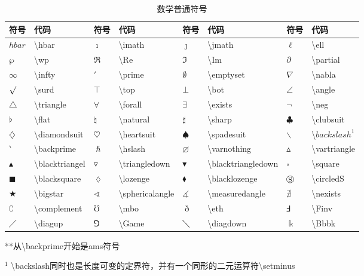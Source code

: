 \documentclass[UTF8,fontset=ubuntu]{ctexart}
\begin{document}
\begin{table}
\begin{tabular}{l l l l l l l l}
	\hline
	符号 & 代码 & 符号 & 代码 & 符号 & 代码 & 符号 & 代码\\
	\hline
	$hbar$ & \textbackslash hbar & $\imath$ & \textbackslash imath & $\jmath$ & \textbackslash jmath & $\ell$ & \textbackslash ell\\
	$\wp$ & \textbackslash wp & $\Re$ & \textbackslash Re & $\Im$ & \textbackslash Im & $\partial$ & \textbackslash partial\\
	$\infty$ & \textbackslash infty & $\prime$ & \textbackslash prime & $\emptyset$ & \textbackslash emptyset & $\nabla$ & \textbackslash nabla\\
	$\surd$ & \textbackslash surd & $\top$ & \textbackslash top & $\bot$ & \textbackslash bot & $\angle$ & \textbackslash angle\\
	$\triangle$ & \textbackslash triangle & $\forall$ & \textbackslash forall & $\exists$ & \textbackslash exists & $\neg$ & \textbackslash neg\\
	$\flat$ & \textbackslash flat & $\natural$ & \textbackslash natural & $\sharp$ & \textbackslash sharp & $\clubsuit$ & \textbackslash clubsuit\\
	$\diamondsuit$ & \textbackslash diamondsuit & $\heartsuit$ & \textbackslash heartsuit & $\spadesuit$ & \textbackslash spadesuit & $\backslash$ & \textbackslash $backslash^1$\\
	$\backprime$ & \textbackslash backprime & $\hslash$ & \textbackslash hslash & $\varnothing$ & \textbackslash varnothing & $\vartriangle$ & \textbackslash vartriangle\\
	$\blacktriangle$ & \textbackslash blacktriangel & $\triangledown$ & \textbackslash triangledown & $\blacktriangledown$ & \textbackslash blacktriangledown & $\square$ & \textbackslash square\\
	$\blacksquare$ & \textbackslash blacksquare & $\lozenge$ & \textbackslash lozenge & $\blacklozenge$ & \textbackslash blacklozenge & $\circledS$ & \textbackslash circledS\\
	$\bigstar$ & \textbackslash bigstar & $\sphericalangle$ & \textbackslash sphericalangle & $\measuredangle$ & \textbackslash measuredangle & $\nexists$ & \textbackslash nexists\\
	$\complement$ & \textbackslash complement & $\mho$ & \textbackslash mbo & $\eth$ & \textbackslash eth & $\Finv$ & \textbackslash Finv\\
	$\diagup$ & \textbackslash diagup & $\Game$ & \textbackslash Game & $\diagdown$ & \textbackslash diagdown & $\Bbbk$ & \textbackslash Bbbk\\
	\hline
\end{tabular}
**从\textbackslash backprime开始是ams符号\par
${}^1$ \hspace{1pt}\textbackslash backslash同时也是长度可变的定界符，并有一个同形的二元运算符\textbackslash setminus
\caption{数学普通符号}
\end{table}
\end{document}
